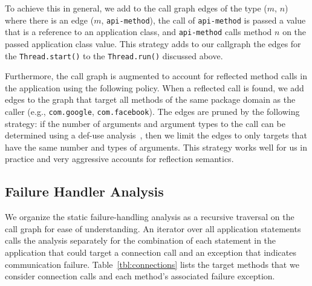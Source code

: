 To achieve this in general, we add to the call graph edges of the type
($m$, $n$) where there is an edge ($m$, \lstinline!api-method!), the
call of \lstinline!api-method! is passed a value that is a reference
to an application class, and \lstinline!api-method! calls method $n$
on the passed application class value.  This strategy adds to our
callgraph the edges for the \lstinline!Thread.start()! to the
\lstinline!Thread.run()! discussed above.

Furthermore, the call graph is augmented to account for reflected
method calls in the application using the following policy.  When a
reflected call is found, we add edges to the graph that target all
methods of the same package domain as the caller (e.g.,
\lstinline!com.google!, \lstinline!com.facebook!).  The edges are pruned by the
following strategy: if the number of arguments and argument types to
the call can be determined using a def-use analysis~\cite{Aho2006},
then we limit the edges to only targets that have the same number and
types of arguments.  This strategy works well for us in
practice and very aggressive accounts for reflection semantics.


\subsection{Failure Handler Analysis}

We organize the static failure-handling analysis as a recursive
traversal on the call graph for ease of understanding.  An iterator
over all application statements calls the analysis separately for the
combination of each statement in the application that could target a
connection call and an exception that indicates communication failure.
Table~\ref{tbl:connections} lists the target methods that we consider
connection calls and each method's associated failure exception.

